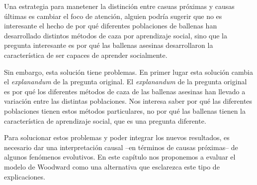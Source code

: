Una estrategia para manetener la distinción entre casuas próximas y causas últimas es cambiar el foco de atención, alguien podría sugerir que no es interesante el hecho de por qué diferentes poblaciones de ballenas han desarrollado distintos métodos de caza por aprendizaje social, sino que la pregunta interesante es por qué las ballenas asesinas desarrollaron la característica de ser capaces de aprender socialmente.

Sin embargo, esta solución tiene problemas. En primer lugar esta solución cambia el \emph{explanandum} de la pregunta original. El \emph{explanandum} de la pregunta original es por qué los diferentes métodos de caza de las ballenas asesinas han llevado a variación entre las distintas poblaciones. Nos interesa saber por qué las diferentes poblaciones tienen estos métodos particulares, no por qué las ballenas tienen la característica de aprendizaje social, que es una pregunta diferente.




Para solucionar estos problemas y poder integrar los nuevos resultados, es necesario dar una interpretación causal --en términos de causas próximas-- de algunos fenómenos evolutivos. En este capítulo nos proponemos a evaluar el modelo de Woodward como una alternativa que esclarezca este tipo de explicaciones.

